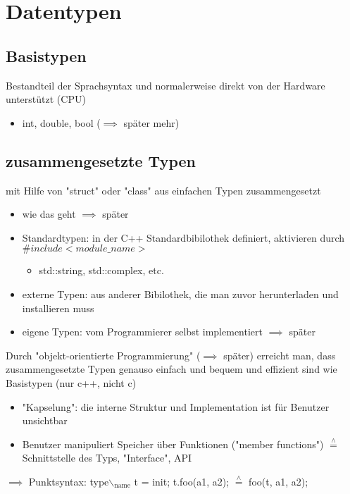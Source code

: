 \documentclass[a4paper]{scrartcl}
\newcommand{\estimates}{\overset{\scriptscriptstyle\wedge}{=}}%
\begin{document}
\section{Datentypen}
\label{sec-8}
\subsection{Basistypen}
\label{sec-8-1}
Bestandteil der Sprachsyntax und normalerweise direkt von der Hardware unterstützt (CPU)
\begin{itemize}
\item int, double, bool ($\implies$ später mehr)
\end{itemize}
\subsection{zusammengesetzte Typen}
\label{sec-8-2}
mit Hilfe von "struct" oder "class" aus einfachen Typen zusammengesetzt
\begin{itemize}
\item wie das geht $\implies$ später
\item Standardtypen: in der C++ Standardbibilothek definiert, aktivieren durch $\#include <module\_name>$
\begin{itemize}
\item std::string, std::complex, etc.
\end{itemize}
\item externe Typen: aus anderer Bibilothek, die man zuvor herunterladen und installieren muss
\item eigene Typen: vom Programmierer selbst implementiert $\implies$ später
\end{itemize}
Durch "objekt-orientierte Programmierung" ($\implies$ später) erreicht man, dass zusammengesetzte
 Typen genauso einfach und bequem und effizient sind wie Basistypen (nur c++, nicht c)
\begin{itemize}
\item "Kapselung": die interne Struktur und Implementation ist für Benutzer unsichtbar
\item Benutzer manipuliert Speicher über Funktionen ("member functions") $\estimates$ Schnittstelle des Typs, "Interface", API
\end{itemize}

$\implies$ Punktsyntax: type$\backslash$$_{\text{name}}$ t = init; t.foo(a1, a2); $\estimates$ foo(t, a1, a2);
\end{document}
